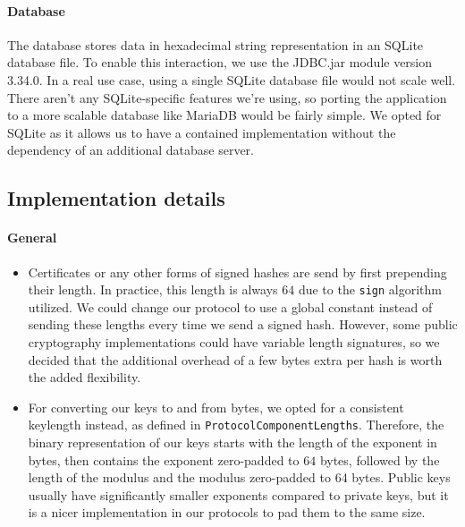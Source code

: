 \documentclass[a4paper]{article}
\begin{document}
\paragraph{Database}
The database stores data in hexadecimal string representation in an SQLite database file. To enable this interaction, we use the JDBC.jar module version 3.34.0. In a real use case, using a single SQLite database file would not scale well. There aren't any SQLite-specific features we're using, so porting the application to a more scalable database like MariaDB would be fairly simple. We opted for SQLite as it allows us to have a contained implementation without the dependency of an additional database server.


\subsection{Implementation details}
\paragraph{General}
\begin{itemize}
    \item Certificates or any other forms of signed hashes are send by first prepending their length. In practice, this length is always $64$ due to the \texttt{sign} algorithm utilized. We could change our protocol to use a global constant instead of sending these lengths every time we send a signed hash. However, some public cryptography implementations could have variable length signatures, so we decided that the additional overhead of a few bytes extra per hash is worth the added flexibility.
    \item For converting our keys to and from bytes, we opted for a consistent keylength instead, as defined in \texttt{ProtocolComponentLengths}. Therefore, the binary representation of our keys starts with the length of the exponent in bytes, then contains the exponent zero-padded to $64$ bytes, followed by the length of the modulus and the modulus zero-padded to $64$ bytes. Public keys usually have significantly smaller exponents compared to private keys, but it is a nicer implementation in our protocols to pad them to the same size.

\end{itemize}
\end{document}

